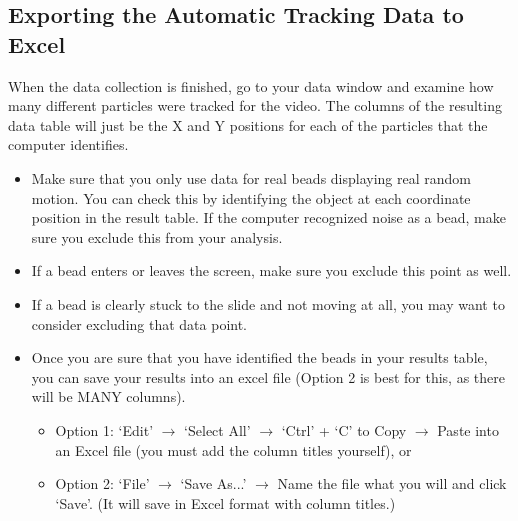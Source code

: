 \subsection*{Exporting the Automatic Tracking Data to Excel}
When the data collection is finished, go to your data window and examine how many different particles were tracked for the video. 
The columns of the resulting data table will just be the X and Y positions for each of the particles that the computer identifies.
\begin{itemize}
\itemsep-0.3em
\item Make sure that you only use data for real beads displaying real random motion. 
You can check this by identifying the object at each coordinate position in the result table. 
If the computer recognized noise as a bead, make sure you exclude this from your analysis. 
\item If a bead enters or leaves the screen, make sure you exclude this point as well. 
\item If a bead is clearly stuck to the slide and not moving at all, you may want to consider excluding that data point. 
\item Once you are sure that you have identified the beads in your results table, you can save your results into an excel file (Option 2 is best for this, as there will be MANY columns).
\begin{itemize}
\item Option 1: `Edit' $\rightarrow$ `Select All' $\rightarrow$ `Ctrl' + `C' to Copy $\rightarrow$ Paste into an Excel file (you must add the column titles yourself), or
\item Option 2: `File' $\rightarrow$ `Save As...' $\rightarrow$ Name the file what you will and click `Save'. (It will save in Excel format with column titles.)
\end{itemize}
\end{itemize}